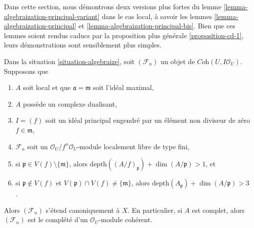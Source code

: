 \noindent
Dans cette section, nous démontrons deux versions plus fortes du
lemme \ref{lemma-algebraization-principal-variant}
dans le cas local, à savoir les lemmes \ref{lemma-algebraization-principal}
et \ref{lemma-algebraization-principal-bis}.
Bien que ces lemmes soient rendus caducs par la proposition plus générale
\ref{proposition-cd-1}, leurs démonstrations sont sensiblement
plus simples.

\begin{lemma}
\label{lemma-algebraization-principal}
Dans la situation \ref{situation-algebraize}, soit $(\mathcal{F}_n)$ un objet
de $\textit{Coh}(U, I\mathcal{O}_U)$. Supposons que
\begin{enumerate}
\item $A$ soit local et que $\mathfrak a = \mathfrak m$ soit l'idéal maximal,
\item $A$ possède un complexe dualisant,
\item $I = (f)$ soit un idéal principal engendré par un élément non diviseur de zéro $f \in \mathfrak m$,
\item $\mathcal{F}_n$ soit un
$\mathcal{O}_U/f^n\mathcal{O}_U$-module localement libre de type fini,
\item si $\mathfrak p \in V(f) \setminus \{\mathfrak m\}$, alors
$\text{depth}((A/f)_\mathfrak p) + \dim(A/\mathfrak p) > 1$, et
\item si $\mathfrak p \not \in V(f)$ et
$V(\mathfrak p) \cap V(f) \not = \{\mathfrak m\}$, alors
$\text{depth}(A_\mathfrak p) + \dim(A/\mathfrak p) > 3$.
\end{enumerate}
Alors $(\mathcal{F}_n)$ s'étend canoniquement à $X$. En particulier, si $A$
est complet, alors $(\mathcal{F}_n)$ est le complété d'un
$\mathcal{O}_U$-module cohérent.
\end{lemma}

